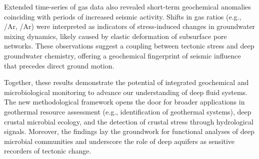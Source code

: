 Extended time-series of gas data also revealed short-term geochemical anomalies coinciding with periods of increased seismic activity.
Shifts in gas ratios (e.g., /Ar, /Ar) were interpreted as indicators of stress-induced changes in groundwater mixing dynamics, likely caused by elastic deformation of subsurface pore networks.
These observations suggest a coupling between tectonic stress and deep groundwater chemistry, offering a geochemical fingerprint of seismic influence that precedes direct ground motion.

Together, these results demonstrate the potential of integrated geochemical and microbiological monitoring to advance our understanding of deep fluid systems.
The new methodological framework opens the door for broader applications in geothermal resource assessment (e.g., identification of geothermal systems), deep crustal microbial ecology, and the detection of crustal stress through hydrological signals.
Moreover, the findings lay the groundwork for functional analyses of deep microbial communities and underscore the role of deep aquifers as sensitive recorders of tectonic change.

\endgroup


\cleardoublepage%


\begingroup
\let\clearpage\relax
\let\cleardoublepage\relax
\let\cleardoublepage\relax


